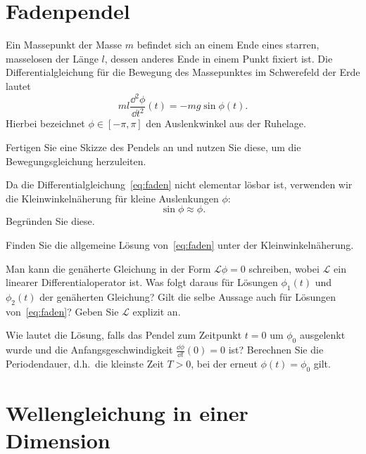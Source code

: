 \documentclass{scrartcl}
\begin{document}
\maketitle


\section{Fadenpendel }
\label{sec:fadenpendel}

Ein Massepunkt der Masse $m$ befindet sich an einem Ende eines starren, masselosen  der Länge $l$, dessen anderes Ende in einem Punkt fixiert ist.
Die Differentialgleichung für die Bewegung des Massepunktes im Schwerefeld der Erde lautet
\[
  ml \frac{\dd^2 \phi}{\dd t^2}(t) = - m g \sin \phi(t).
  \label{eq:faden}
\]
Hierbei bezeichnet $\phi \in [-\pi, \pi]$ den Auslenkwinkel aus der Ruhelage.
\begin{subex}
  \item{} Fertigen Sie eine Skizze des Pendels an und nutzen Sie diese, um die Bewegungsgleichung herzuleiten.
  \item{} Da die Differentialgleichung~\eqref{eq:faden} nicht elementar lösbar ist, verwenden wir die Kleinwinkelnäherung für kleine Auslenkungen $\phi$:
  \[
    \sin \phi \approx \phi.
  \]
  Begründen Sie diese.
  \item{} Finden Sie die allgemeine Lösung von~\eqref{eq:faden} unter der Kleinwinkelnäherung.
  \item{} Man kann die genäherte Gleichung in der Form $\mathcal{L}\phi = 0$ schreiben, wobei $\mathcal{L}$ ein linearer Differentialoperator ist. 
  Was folgt daraus für Lösungen $\phi_1(t)$ und $\phi_2(t)$ der genäherten Gleichung?
  Gilt die selbe Aussage auch für Lösungen von~\eqref{eq:faden}?  
  Geben Sie $\mathcal{L}$ explizit an.
  \item{} Wie lautet die Lösung, falls das Pendel zum Zeitpunkt $t = 0$ um $\phi_0$ ausgelenkt wurde und die Anfangsgeschwindigkeit $\frac{\dd \phi}{\dd t}(0) = 0$ ist?
  Berechnen Sie die Periodendauer, d.h.\ die kleinste Zeit $T > 0$, bei der erneut $\phi(t) = \phi_0$ gilt.
\end{subex}

\newpage
\section{Wellengleichung in einer Dimension }
\label{sec:wellengleichung_in_einer_dimension}
\end{document}
